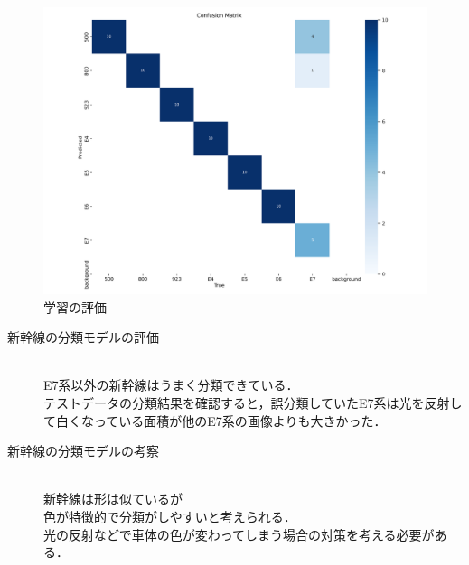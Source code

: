 

\begin{figure}
	\centering
	\includegraphics[width=0.6\linewidth]{fig/confusion_matrix}
	\caption{学習の評価}
	\label{fig:confusionmatrix}
\end{figure}

\newpage

\begin{description}
	
	
	\item [新幹線の分類モデルの評価]~\\
	E7系以外の新幹線はうまく分類できている．\\
	テストデータの分類結果を確認すると，誤分類していたE7系は光を反射して白くなっている面積が他のE7系の画像よりも大きかった．
	\item [新幹線の分類モデルの考察]~\\
	新幹線は形は似ているが\\色が特徴的で分類がしやすいと考えられる．\\
	光の反射などで車体の色が変わってしまう場合の対策を考える必要がある．\\
	
\end{description}
\newpage


